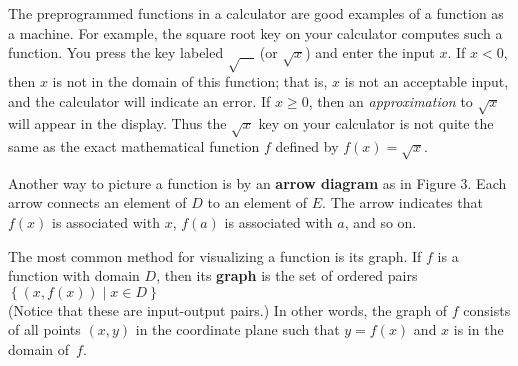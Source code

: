 \documentclass{sebase}
\begin{document}
The preprogrammed functions in a calculator are good examples of a function
as a machine. For example, the square root key on your calculator computes
such a function. You press the key labeled $\sqrt{\quad }\ $(or $\sqrt{x}$)
and enter the input $x$. If $x<0$, then $x$ is not in the domain of this
function; that is, $x$ is not an acceptable input, and the calculator will
indicate an error. If $x\geq 0$, then an \textit{approximation} to $\sqrt{x}$
will appear in the display. Thus the $\sqrt{x}$ key on your calculator is
not quite the same as the exact mathematical function $f$ defined by $f(x)=%
\sqrt{x}$.

%
Another way to picture a function is by an \textbf{arrow diagram} as in
Figure 3. Each arrow connects an element of $D$ to an element of $E$. The
arrow indicates that $f(x)$ is associated with $x$, $f(a)$ is associated
with $a$, and so on.

The most common method for visualizing a function is its graph. If $f$ is a
function with domain $D$, then its \textbf{graph} is the set of ordered pairs%
\\[6pt]
\hspace*{\fill}$\left\{ (x,f(x))\mid x\in D\right\} $\hspace*{\fill}\\[6pt]
(Notice that these are input-output pairs.) In other words, the graph of $f$
consists of all points $(x,y)$ in the coordinate plane such that $y=f(x)$
and $x$ is in the domain of~$f$.
\end{document}
